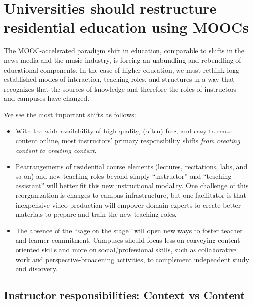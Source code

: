\section{Universities should restructure residential education using MOOCs}



The MOOC-accelerated paradigm shift in education, comparable to shifts
in the news media and the music industry,
is forcing an unbundling and rebundling of educational components. In the
case of higher education, 
we must rethink long-established modes of interaction, teaching roles,
and structures in a way that recognizes
that the sources of knowledge and therefore the roles of instructors and
campuses have changed.

We see the most important shifts as follows:

\begin{itemize}

\item With the wide availability of high-quality, (often) free, and
easy-to-reuse content online, most instructors' primary responsibility
shifts \emph{from creating content to creating context}.

\item Rearrangements of residential course elements (lectures,
  recitations, labs, and so on) and new teaching roles beyond simply ``instructor''
  and ``teaching assistant'' will better fit this new instructional
  modality.  One challenge of this reorganization is changes to campus
  infrastructure, but one facilitator is that inexpensive video production
  will empower domain experts to create 
  better materials to prepare and train the new teaching roles.

\item The absence of the ``sage on the stage'' will open new ways to
foster teacher and learner commitment.  Campuses should
focus less on conveying content-oriented skills and more on
social/professional skills, such as collaborative work and
perspective-broadening activities, to complement  independent study
and discovery.

\end{itemize} 

\subsection{Instructor responsibilities: Context vs Content}

